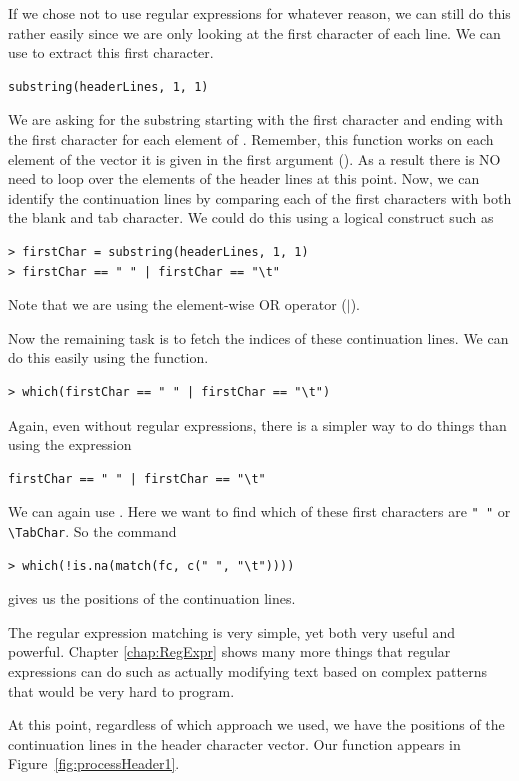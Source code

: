 If we chose not to use regular expressions for whatever reason,
we can still do this rather easily since we are only looking
at the first character of each line.
We can use
to extract this first character.
\begin{verbatim}
substring(headerLines, 1, 1)
\end{verbatim}
We are asking for the substring
starting with the first character and ending
with the first character for each element
of  .
Remember, this function works on each element
of the vector it is given in the first argument
().
As a result there is NO need to loop over the elements
of the header lines at this point.
Now, we can identify the continuation 
lines by comparing each of the first characters
with both the blank and tab character.
We could do this using a logical construct such as
\begin{verbatim}
> firstChar = substring(headerLines, 1, 1)
> firstChar == " " | firstChar == "\t"
\end{verbatim}
Note that we are using the element-wise
OR operator ($|$).

Now the remaining task is to fetch the indices of these
continuation lines.
We can do this easily
using the  
function.
\begin{verbatim}
> which(firstChar == " " | firstChar == "\t")
\end{verbatim}

Again, even without regular expressions, there is a simpler
way to do things than using the expression
\begin{verbatim}
firstChar == " " | firstChar == "\t"
\end{verbatim}
We can again use .
Here we want to find 
which of these first characters are \verb+" "+ or \verb+\TabChar+.
So the command
\begin{verbatim}
> which(!is.na(match(fc, c(" ", "\t"))))
\end{verbatim}
gives us the positions of the continuation lines.

The regular expression matching is very simple, yet both very useful and 
powerful.  
Chapter \ref{chap:RegExpr} shows many more things that regular expressions
can do such as actually modifying text based on complex patterns
that would be very hard to program.

At this point, regardless of which approach we used, we have the
positions of the continuation lines in the header character vector.
Our  function appears in 
Figure~\ref{fig:processHeader1}.

